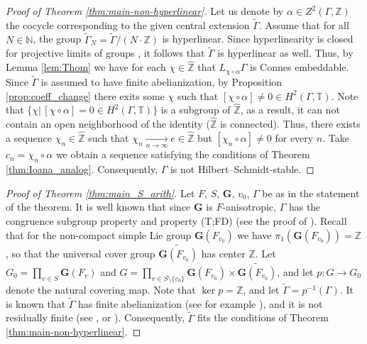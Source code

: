 \documentclass[11pt]{amsart}
\newcommand{\T}{{\mathbb{T}}}
\newcommand{\N}{{\mathbb{N}}}
\newcommand{\Z}{{\mathbb{Z}}}
\newcommand{\bG}{{\mathbf{G}}}
\theoremstyle{definition}
\theoremstyle{remark}
\theoremstyle{definition}
\begin{document}
\begin{proof}[Proof of Theorem \ref{thm:main-non-hyperlinear}]
Let us denote by $\alpha \in Z^2(\Gamma, \Z)$ the cocycle corresponding to the given central extension $\widetilde{\Gamma}$.
Assume that for all $N \in \N$, the group $\widetilde{\Gamma}_N=\widetilde{\Gamma} / (N\cdot \Z)$ is hyperlinear.
Since hyperlinearity is closed for projective limits of groups \cite[Corollary 7.5.9]{CS-C}, it follows that $\widetilde{\Gamma}$ is hyperlinear as well.
Thus, by Lemma \ref{lem:Thom} we have for each $\chi \in \widehat{\Z}$ that $L_{\chi \circ \alpha} \Gamma$ is 
Connes embeddable. Since $\widetilde{\Gamma}$ is assumed to have finite abelianization, by Proposition \ref{prop:coeff_change} there exits some $\chi$ such that
$[\chi \circ \alpha] \neq 0 \in H^2(\Gamma, \T)$. Note that $\{ \chi \vert \, [\chi \circ \alpha] = 0 \in H^2(\Gamma,\T)\}$ is a subgroup of $\widehat \Z$, as a result, it can not contain an open neighborhood of the identity  ($\widehat \Z$ is connected).
Thus, there exists a sequence $\chi_n \in \widehat \Z$ such that $\chi_n \xrightarrow[n \to \infty]{} e \in \widehat \Z$ but
$[\chi_n \circ \alpha] \neq 0$ for every $n$. Take $c_n = \chi_n \circ \alpha$ we obtain a sequence satisfying the
conditions of Theorem \ref{thm:Ioana_analog}. Consequently, $\Gamma$ is not Hilbert--Schmidt-stable.
\end{proof}

\begin{proof}[Proof of Theorem \ref{thm:main_S_arith}]
Let $F$, $S$, $\bG$, $v_0$, $\Gamma$ be as in the statement of the theorem.
It is well known that since $\bG$ is $F$-anisotropic, $\Gamma$ has the congruence subgroup property and property (T;FD) (see the proof of \cite[Theorem 9.5]{LZ}).
Recall that for the non-compact simple Lie group $\bG(F_{v_0})$ we have $\pi_1(\bG(F_{v_0})) = \Z$, so that the universal cover group $\widetilde{\bG(F_{v_0})}$ has center $\Z$.
Let $G_0 = \prod_{v \in S} \bG(F_v)$ and $G = \prod_{v \in S \setminus \{v_0\}} \bG(F_{v_0}) \times \widetilde{\bG(F_{v_0})}$, and let $p: G \to G_0$ denote the natural covering map.
Note that $\ker p = \Z$, and let $\widetilde{\Gamma} = p^{-1}(\Gamma)$.
It is known that $\widetilde{\Gamma}$ has finite abelianization (see for example \cite[Proposition 2.1]{DH}), and it is not residually finite (see \cite[Theorem 3.3 and Remark 3.5]{stover2024residual}, or \cite{Rag_torsion}).
Consequently, $\widetilde{\Gamma}$ fits the conditions of Theorem \ref{thm:main-non-hyperlinear}.

\end{proof}
\end{document}
